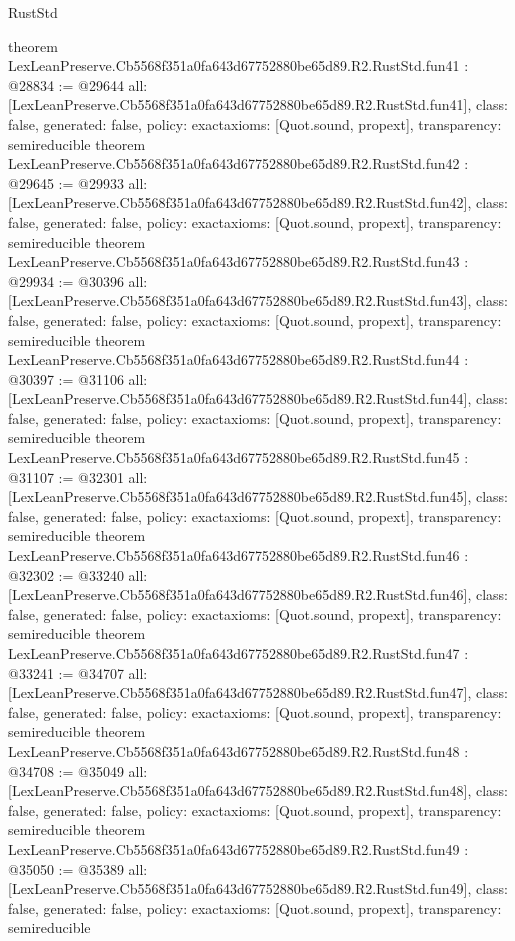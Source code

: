 \begin{lexlean}{RustStd}
\begin{coremodule}
{}
theorem LexLeanPreserve.Cb5568f351a0fa643d67752880be65d89.R2.RustStd.fun41 : @28834 := @29644 {
  all: [LexLeanPreserve.Cb5568f351a0fa643d67752880be65d89.R2.RustStd.fun41],
  class: false,
  generated: false,
  policy: exact{axioms: [Quot.sound, propext]},
  transparency: semireducible
}
theorem LexLeanPreserve.Cb5568f351a0fa643d67752880be65d89.R2.RustStd.fun42 : @29645 := @29933 {
  all: [LexLeanPreserve.Cb5568f351a0fa643d67752880be65d89.R2.RustStd.fun42],
  class: false,
  generated: false,
  policy: exact{axioms: [Quot.sound, propext]},
  transparency: semireducible
}
theorem LexLeanPreserve.Cb5568f351a0fa643d67752880be65d89.R2.RustStd.fun43 : @29934 := @30396 {
  all: [LexLeanPreserve.Cb5568f351a0fa643d67752880be65d89.R2.RustStd.fun43],
  class: false,
  generated: false,
  policy: exact{axioms: [Quot.sound, propext]},
  transparency: semireducible
}
theorem LexLeanPreserve.Cb5568f351a0fa643d67752880be65d89.R2.RustStd.fun44 : @30397 := @31106 {
  all: [LexLeanPreserve.Cb5568f351a0fa643d67752880be65d89.R2.RustStd.fun44],
  class: false,
  generated: false,
  policy: exact{axioms: [Quot.sound, propext]},
  transparency: semireducible
}
theorem LexLeanPreserve.Cb5568f351a0fa643d67752880be65d89.R2.RustStd.fun45 : @31107 := @32301 {
  all: [LexLeanPreserve.Cb5568f351a0fa643d67752880be65d89.R2.RustStd.fun45],
  class: false,
  generated: false,
  policy: exact{axioms: [Quot.sound, propext]},
  transparency: semireducible
}
theorem LexLeanPreserve.Cb5568f351a0fa643d67752880be65d89.R2.RustStd.fun46 : @32302 := @33240 {
  all: [LexLeanPreserve.Cb5568f351a0fa643d67752880be65d89.R2.RustStd.fun46],
  class: false,
  generated: false,
  policy: exact{axioms: [Quot.sound, propext]},
  transparency: semireducible
}
theorem LexLeanPreserve.Cb5568f351a0fa643d67752880be65d89.R2.RustStd.fun47 : @33241 := @34707 {
  all: [LexLeanPreserve.Cb5568f351a0fa643d67752880be65d89.R2.RustStd.fun47],
  class: false,
  generated: false,
  policy: exact{axioms: [Quot.sound, propext]},
  transparency: semireducible
}
theorem LexLeanPreserve.Cb5568f351a0fa643d67752880be65d89.R2.RustStd.fun48 : @34708 := @35049 {
  all: [LexLeanPreserve.Cb5568f351a0fa643d67752880be65d89.R2.RustStd.fun48],
  class: false,
  generated: false,
  policy: exact{axioms: [Quot.sound, propext]},
  transparency: semireducible
}
theorem LexLeanPreserve.Cb5568f351a0fa643d67752880be65d89.R2.RustStd.fun49 : @35050 := @35389 {
  all: [LexLeanPreserve.Cb5568f351a0fa643d67752880be65d89.R2.RustStd.fun49],
  class: false,
  generated: false,
  policy: exact{axioms: [Quot.sound, propext]},
  transparency: semireducible
}
\end{coremodule}
\end{lexlean}
